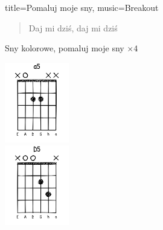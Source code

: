 \begin{song}{title={Pomaluj moje sny}, music={Breakout}}
\begin{multicols}{2}
\begin{verse}
        Daj mi dziś, daj mi dziś
    \end{verse}
    \begin{chorus}
        Sny kolorowe, pomaluj moje sny $\times 4$
    \end{chorus}
    \vfill\null\columnbreak{}
    \begin{center}
        \includegraphics[height=3.5cm]{images/a5.png} \\
        \vspace{0.6cm}
        \includegraphics[height=3.5cm]{images/D5.png}
    \end{center}
    \end{multicols}
\end{song}

